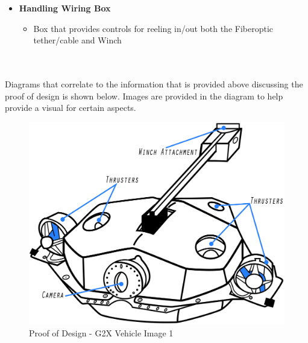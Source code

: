 \documentclass[12pt]{article}
\begin{document}
{\begin{itemize}
\begin{itemize}
\begin{itemize}
						\item Reeled in/out via the Handling Wiring Box
					\end{itemize}
					\item[] \textbf{Handling Wiring Box}
					\begin{itemize}
						\item Box that provides controls for reeling in/out both the Fiberoptic tether/cable and Winch
					\end{itemize}
				\end{itemize}
			\end{itemize}
		}
	
		\noindent \\\\Diagrams that correlate to the information that is provided above discussing the proof of design is shown below. Images are provided in the diagram to help provide a visual for certain aspects.

		\begin{figure}[!htb]
			\centering
			\includegraphics[width = 120mm]{assets/basic_sub.jpg}
			\caption{Proof of Design - G2X Vehicle Image 1 \label{overflow}}
		\end{figure}
	
\end{document}
